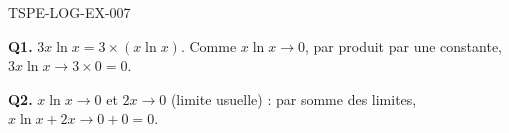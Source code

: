 \begin{corrige}{TSPE-LOG-EX-007}

\textbf{Q1.} $3x\ln x = 3 \times (x\ln x)$. Comme $x\ln x \to 0$, par produit par une constante, $3x\ln x \to 3 \times 0 = 0$.

\textbf{Q2.} $x\ln x \to 0$ et $2x \to 0$ (limite usuelle) : par somme des limites, $x\ln x + 2x \to 0 + 0 = 0$.

\end{corrige}
